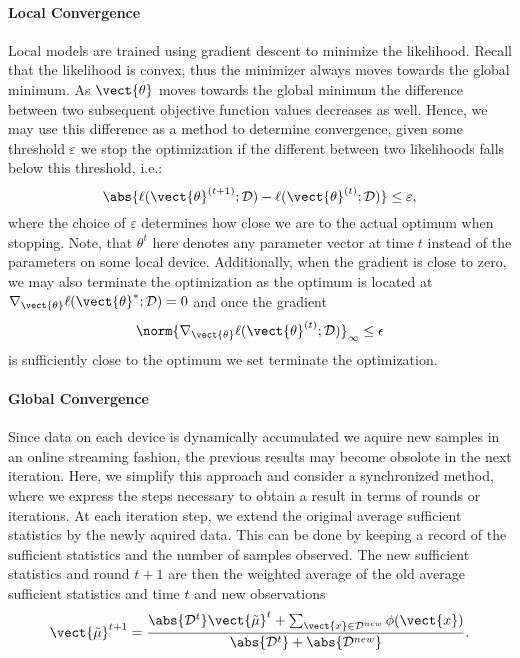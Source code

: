 \paragraph*{Local Convergence}
Local models are trained using gradient descent to minimize the likelihood. 
Recall that the likelihood is convex, thus the minimizer always moves towards the global minimum.
As $\vect{\theta}$ moves towards the global minimum the difference between two subsequent objective function values decreases as well.
Hence, we may use this difference as a method to determine convergence, given some threshold $\varepsilon$ we stop the optimization if the different between two likelihoods falls below this threshold, i.e.:
\begin{equation}
    \abs{\ell(\vect{\theta}^{(t+1)} ; \mathcal{D}) - \ell(\vect{\theta}^{(t)} ; \mathcal{D})} \leq \varepsilon,
\end{equation}
where the choice of $\varepsilon$ determines how close we are to the actual optimum when stopping.
Note, that $\theta^t$ here denotes any parameter vector at time $t$ instead of the parameters on some local device.
Additionally, when the gradient is close to zero, we may also terminate the optimization as the optimum is located at $\nabla_{\vect{\theta}} \ell(\vect{\theta}^{*} ; \mathcal{D}) = 0$ and once the gradient
\begin{equation}
    \norm{\nabla_{\vect{\theta}} \ell(\vect{\theta}^{(t)} ; \mathcal{D})}_{\infty} \leq \epsilon
\end{equation}
is sufficiently close to the optimum we set terminate the optimization. 


\paragraph*{Global Convergence}
Since data on each device is dynamically accumulated we aquire new samples in an online streaming fashion, the previous results may become obsolote in the next iteration.
Here, we simplify this approach and consider a synchronized method, where we express the steps necessary to obtain a result in terms of rounds or iterations. 
At each iteration step, we extend the original average sufficient statistics by the newly aquired data. 
This can be done by keeping a record of the sufficient statistics and the number of samples observed.
The new sufficient statistics and round $t+1$ are then the weighted average of the old average sufficient statistics and time $t$ and new observations 
\begin{equation}
    \vect{\tilde{\mu}}^{t+1} = \frac{\abs{\mathcal{D}^{t}}\vect{\tilde{\mu}}^t + \sum_{\vect{x} \in \mathcal{D}^{new}} \phi(\vect{x})}{\abs{\mathcal{D}^{t}} + \abs{\mathcal{D}^{new}}}.
\end{equation}

